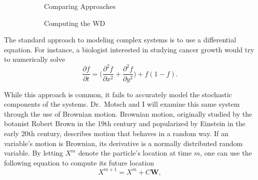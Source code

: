 \documentclass[8 pt, leqno]{article}
\begin{document}
\begin{figure}
\begin{subfigure}[t]{0.48\textwidth}
\begin{tikzpicture}
\end{tikzpicture}
      \caption{Comparing Approaches}\label{fig:1a}
    \end{subfigure}
    \begin{subfigure}[t]{0.48\textwidth}
      \centering
{}
      \caption{Computing the WD}\label{fig:1b}
    \end{subfigure}
  \caption{}\label{fig:1}
\end{figure}
%



The standard approach to modeling complex systems is to use a differential equation. For instance, a biologist interested in studying cancer growth would try to numerically solve
\begin{equation}
\frac{\partial f}{\partial t} = \Big(\frac{\partial^2 f}{\partial x^2} + \frac{\partial^2 f}{\partial y^2}\Big)+ f(1-f).
\label{eq: Macro}
\end{equation}

\noindent While this approach is common, it fails to accurately model the stochastic components of the systems. Dr.\ Motsch and I will examine this same system through the use of Brownian motion. Brownian motion, originally studied by the botanist Robert Brown in the 19th century and popularized by Einstein in the early 20th century, describes motion that behaves in a random way. If an variable's motion is Brownian, its derivative is a normally distributed random variable. By letting $X^m$ denote the particle's location at time $m$, one can use the following equation to compute its future location
\begin{equation}
X^{m+1} = X^{m} + C\textbf{W},
\label{eq: Micro}
\end{equation}
\end{document}
